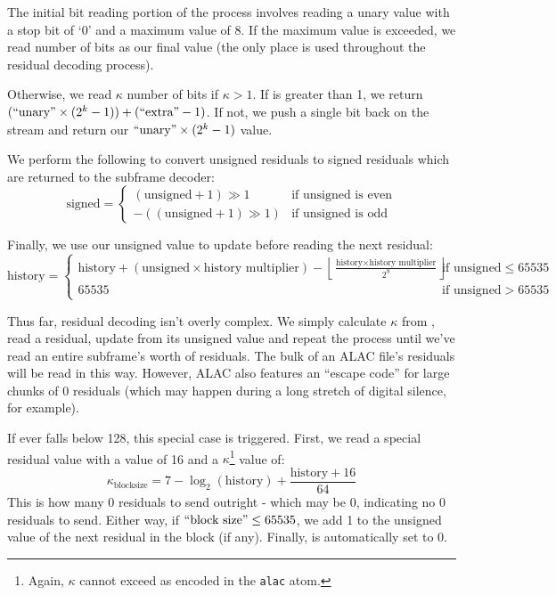 The initial bit reading portion of the process
involves reading a unary value with a stop bit of `0'
and a maximum value of 8.
If the maximum value is exceeded, we read 
number of bits as our final value
(the only place  is used throughout the
residual decoding process).

Otherwise, we read $\kappa$ number of  bits if $\kappa > 1$.
If  is greater than 1, we return
$(\text{``{unary}''} \times (2^k - 1)) + (\text{``{extra}''} - 1)$.
If not, we push a single  bit back on the stream and return our
$\text{``{unary}''} \times (2^k - 1)$ value.

\clearpage

We perform the following to convert unsigned residuals to signed residuals
which are returned to the subframe decoder:
\begin{equation}
\text{signed} =
\begin{cases}
(\text{unsigned} + 1) \gg 1 & \text{if unsigned is even} \\
-((\text{unsigned} + 1) \gg 1) & \text{if unsigned is odd}
\end{cases}
\end{equation}

Finally, we use our unsigned value to update 
before reading the next residual:
{
\begin{equation*}
\text{history} =
\begin{cases}
\text{history} + (\text{unsigned} \times \text{history multiplier}) - \left\lfloor\frac{\text{history} \times \text{history multiplier}}{2^9}\right\rfloor & \text{if unsigned} \leq 65535 \\
65535 & \text{if unsigned} > 65535
\end{cases}
\end{equation*}
}

Thus far, residual decoding isn't overly complex.
We simply calculate $\kappa$ from , read a residual,
update  from its unsigned value and repeat the process
until we've read an entire subframe's worth of residuals.
The bulk of an ALAC file's residuals will be read in this way.
However, ALAC also features an ``escape code'' for large chunks
of 0 residuals (which may happen during a long stretch of
digital silence, for example).

If  ever falls below 128, this special case is triggered.
First, we read a special  residual value
with a  value of 16 and a $\kappa$\footnote{Again, $\kappa$ cannot exceed  as encoded in the \texttt{alac} atom.} value of:
\begin{equation}
\kappa_{\text{blocksize}} = 7 - \log_2(\text{history}) + \frac{\text{history} + 16}{64}
\end{equation}
This  is how many 0 residuals to send outright -
which may be 0, indicating no 0 residuals to send.
Either way, if $\text{``{block size}''} \leq 65535$,
we add 1 to the unsigned value of the next residual in the block (if any).
Finally,  is automatically set to 0.

